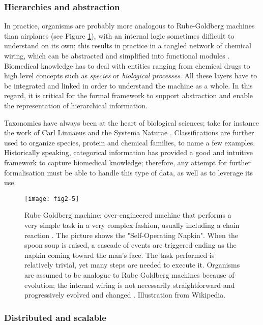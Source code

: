 \subsubsection{Hierarchies and abstraction}
\label{reqhie}

In practice, organisms are probably more analogous to Rube-Goldberg machines than airplanes (see Figure \ref{fig2-5}), with an internal logic sometimes difficult to understand on its own; this results in practice in a tangled network of chemical wiring, which can be abstracted and simplified into functional modules \citep{hartwell1999molecular} \citep{ravasz2002hierarchical} \citep{machado2011modeling} \citep{fisher2007executable}. Biomedical knowledge has to deal with entities ranging from chemical drugs to high level concepts such as \emph{species} or \emph{biological processes}. All these layers have to be integrated and linked in order to understand the machine as a whole. In this regard, it is critical for the formal framework to support abstraction and enable the representation of hierarchical information.

Taxonomies have always been at the heart of biological sciences; take for instance the work of Carl Linnaeus and the Systema Naturae \citep{von1770systema}. Classifications are further used to organize species, protein and chemical families, to name a few examples. Historically speaking, categorical information has provided a good and intuitive framework to capture biomedical knowledge; therefore, any attempt for further formalisation must be able to handle this type of data, as well as to leverage its use.

\begin{figure}[ht]
    \centering
    \texttt{[image: fig2-5]}
    \caption{Rube Goldberg machine: over-engineered machine that performs a very simple task in a very complex fashion, usually including a chain reaction \citep{rubewiki}. The picture shows the "Self-Operating Napkin". When the spoon soup is raised, a cascade of events are triggered ending as the napkin coming toward the man's face. The task performed is relatively trivial, yet many steps are needed to execute it. Organisms are assumed to be analogue to Rube Goldberg machines because of evolution; the internal wiring is not necessarily straightforward and progressively evolved and changed \citep{ravasz2002hierarchical}. Illustration from Wikipedia.}
    \label{fig2-5}
\end{figure}

\subsubsection{Distributed and scalable}
\label{reqscale}

